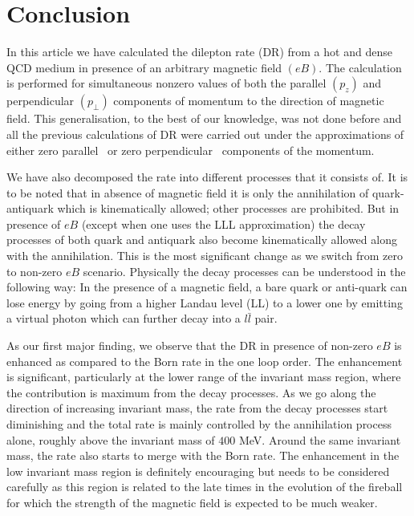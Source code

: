 \documentclass[aps,prd,floatfix,showpacs,showkeys,superscriptadress,unsortedaddress,nofootinbib,onecolumn]{revtex4-1}
\newcommand{\sperp}{\scriptscriptstyle{\perp}}
\begin{document}
\section{Conclusion}
\label{sec:con}

In this article we have calculated the dilepton rate (DR) from a hot and dense QCD medium in presence of an arbitrary magnetic field $(eB)$. The calculation is performed for simultaneous nonzero values of both the parallel $(p_z)$ and perpendicular $(p_{\sperp})$ components of momentum to the direction of magnetic field. This generalisation, to the best of our knowledge, was not done before and all the previous calculations of DR were carried out under the approximations of either zero parallel~\cite{Sadooghi:2016jyf} or zero perpendicular~\cite{Ghosh:2018xhh} components of the momentum. 

We have also decomposed the rate into different processes that it consists of. It is to be noted that in absence of magnetic field it is only the annihilation of quark-antiquark which is kinematically allowed; other processes are prohibited. But in presence of $eB$ (except when one uses the LLL approximation) the decay processes of both quark and antiquark also become kinematically allowed along with the annihilation. This is the most significant change as we switch from zero to non-zero $eB$ scenario. Physically the decay processes can be understood in the following way: In the presence of a magnetic field, a bare quark or anti-quark can lose energy by going from a higher Landau level (LL) to a lower one by emitting a virtual photon which can further decay into a $l\bar{l}$ pair.

As our first major finding, we observe that the DR in presence of non-zero $eB$ is enhanced as compared to the Born rate in the one loop order. The enhancement is significant, particularly at the lower range of the invariant mass region, where the contribution is maximum from the decay processes. As we go along the direction of increasing invariant mass, the rate from the decay processes start diminishing and the total rate is mainly controlled by the annihilation process alone, roughly above the invariant mass of $400$ MeV. Around the same invariant mass, the rate also starts to merge with the Born rate. The enhancement in the low invariant mass region is definitely encouraging but needs to be considered carefully as this region is related to the late times in the evolution of the fireball for which the strength of the magnetic field is expected to be much weaker.
\end{document}
